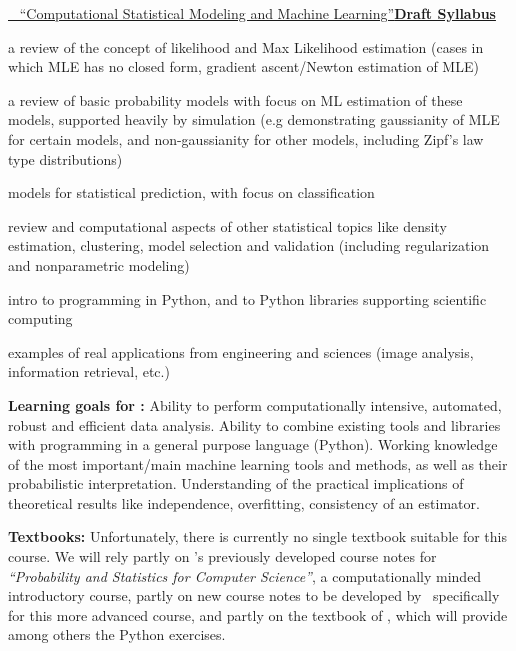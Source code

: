 \vskip 0.2in
\bit
\item  \underline{\statcl~ ``Computational Statistical Modeling and Machine Learning''{\bf Draft Syllabus}} \\
\bit
\item a review of the concept of likelihood and Max Likelihood estimation (cases in which MLE has no closed form, gradient ascent/Newton estimation of MLE)
\item a review of basic probability models with focus on ML estimation of these models, supported heavily by simulation (e.g demonstrating gaussianity of MLE for certain models, and non-gaussianity for other models, including Zipf's law type distributions)
\item models for statistical prediction, with focus on classification
\item review and computational aspects of other statistical topics like
  density estimation, clustering, model selection and validation
  (including regularization and  nonparametric modeling)
\item intro to programming in Python, and to Python libraries supporting scientific computing
\item examples of real applications from engineering and sciences (image analysis, information retrieval, etc.)
\eit
\item[]{\bf Learning goals for \statcl:} Ability to perform computationally intensive, automated, robust and efficient data analysis. Ability to combine existing tools and libraries with programming in a general purpose language (Python). 
Working knowledge of the most important/main machine learning tools and methods, as well as their probabilistic interpretation. Understanding of the practical implications of theoretical results like independence, overfitting, consistency of an estimator. 

{\bf Textbooks:} Unfortunately, there is currently no single textbook
suitable for this course. We will rely partly on \meila's previously
developed course notes for {\it ``Probability and Statistics for
  Computer Science''}, a computationally minded introductory course,
partly on new course notes to be developed by \meila\ specifically for
this more advanced course, and partly on the textbook of \astrocl,
which will provide among others the Python exercises. %


